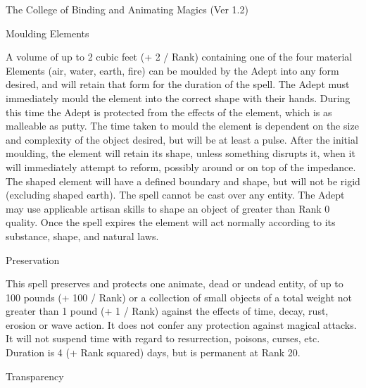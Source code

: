 \begin{Chapter}{The College of Binding and Animating Magics (Ver 1.2)}
\begin{spell}[G-8]{Moulding Elements}

\begin{effects}
A volume of up to 2 cubic feet (+ 2 / Rank) containing one of the four
material Elements (air, water, earth, fire) can be moulded by the
Adept into any form desired, and will retain that form for the
duration of the spell. The Adept must immediately mould the element
into the correct shape with their hands. During this time the Adept is
protected from the effects of the element, which is as malleable as
putty.  The time taken to mould the element is dependent on the size
and complexity of the object desired, but will be at least a pulse.
After the initial moulding, the element will retain its shape, unless
something disrupts it, when it will immediately attempt to reform,
possibly around or on top of the impedance.  The shaped element will
have a defined boundary and shape, but will not be rigid (excluding
shaped earth). The spell cannot be cast over any entity. The Adept may
use applicable artisan skills to shape an object of greater than Rank
0 quality. Once the spell expires the element will act normally
according to its substance, shape, and natural laws.
\end{effects}
\end{spell}

\begin{spell}[G-9]{Preservation}


\begin{effects}
This spell preserves and protects one animate, dead or undead entity,
of up to 100 pounds (+ 100 / Rank) or a collection of small objects of
a total weight not greater than 1 pound (+ 1 / Rank) against the
effects of time, decay, rust, erosion or wave action.  It does not
confer any protection against magical attacks.  It will not suspend
time with regard to resurrection, poisons, curses, etc.  Duration is 4
(+ Rank squared) days, but is permanent at Rank 20.
\end{effects}
\end{spell}

\begin{spell}[G-10]{Transparency}


\end{spell}
\end{Chapter}

